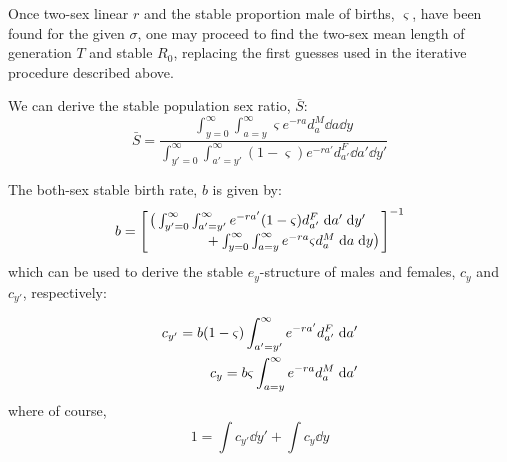  \FloatBarrier
\label{sec:2sexlinearother}
Once two-sex linear $r$ and the stable proportion male of births, $\varsigma$,
have been found for the given $\sigma$, one may proceed to find the 
two-sex mean length of generation $T$ and stable $R_0$,
replacing the first guesses used in the iterative procedure described above.

We can derive the stable population sex ratio, $\bar{S}$:
\begin{equation}
\bar{S} = \frac{ \int_{y=0}^\infty \int_{a=y}^\infty \varsigma e^{-ra} d_{a}^M
\dd a \dd y}{\int_{y'=0}^\infty \int_{a'=y'}^\infty (1-\varsigma) e^{-ra'}
d_{a'}^F \dd a' \dd y'}
\end{equation}

The both-sex stable birth rate, $b$ is given by:
\begin{equation}
b = \Bigg[
            \splitfrac{\big( \int _{y'=0}^\infty
            \int _{a'=y'}^\infty e^{-r a'} (1-\varsigma) d_{a'}^F \dd a' \dd
            y'}{ + \int _{y=0}^\infty \int _{a=y}^\infty
             e^{-r a} \varsigma d_{a}^M \dd a \dd y\big)} \Bigg] ^{-1}          
\end{equation}
which can be used to derive the stable $e_y$-structure of males and females,
$c_y$ and $c_{y'}$, respectively:

\begin{align}
c_{y'} = b (1-\varsigma) \int _{a'=y'}^\infty
e^{-ra'} d_{a'}^F \; \mathrm{d} a' \notag \\
c_{y} = b \varsigma \int _{a=y}^\infty
e^{-ra} d_{a}^M \; \mathrm{d} a'
\label{eq:stablecy}
\end{align}
where of course,
\begin{equation}
1 = \int c_{y'} \dd y' + \int c_{y} \dd y
\end{equation}
